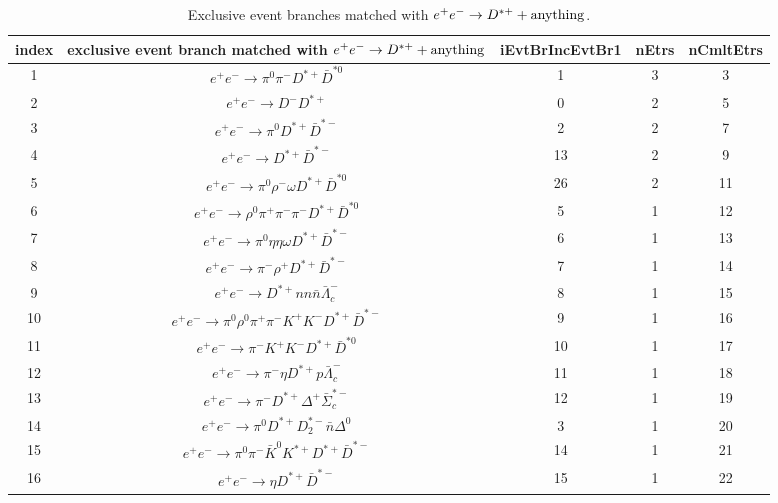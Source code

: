 \documentclass[landscape]{article}
\begin{document}
\begin{table}[htbp!]
\caption{Exclusive event branches matched with $ e^{+} e^{-} \rightarrow D^{*+} + \rm{anything} $.}
\small
\centering
\begin{tabular}{|c|c|c|c|c|}
\hline
index & exclusive event branch matched with $ e^{+} e^{-} \rightarrow D^{*+} + \rm{anything} $ & iEvtBrIncEvtBr1 & nEtrs & nCmltEtrs \\
\hline
1 & $ e^{+} e^{-} \rightarrow \pi^{0} \pi^{-} D^{*+} \bar{D}^{*0} $ & 1 & 3 & 3 \\
\hline
2 & $ e^{+} e^{-} \rightarrow D^{-} D^{*+} $ & 0 & 2 & 5 \\
\hline
3 & $ e^{+} e^{-} \rightarrow \pi^{0} D^{*+} \bar{D}^{*-} $ & 2 & 2 & 7 \\
\hline
4 & $ e^{+} e^{-} \rightarrow D^{*+} \bar{D}^{*-} $ & 13 & 2 & 9 \\
\hline
5 & $ e^{+} e^{-} \rightarrow \pi^{0} \rho^{-} \omega D^{*+} \bar{D}^{*0} $ & 26 & 2 & 11 \\
\hline
6 & $ e^{+} e^{-} \rightarrow \rho^{0} \pi^{+} \pi^{-} \pi^{-} D^{*+} \bar{D}^{*0} $ & 5 & 1 & 12 \\
\hline
7 & $ e^{+} e^{-} \rightarrow \pi^{0} \eta \eta \omega D^{*+} \bar{D}^{*-} $ & 6 & 1 & 13 \\
\hline
8 & $ e^{+} e^{-} \rightarrow \pi^{-} \rho^{+} D^{*+} \bar{D}^{*-} $ & 7 & 1 & 14 \\
\hline
9 & $ e^{+} e^{-} \rightarrow D^{*+} n n \bar{n} \bar{\Lambda}_{c}^{-} $ & 8 & 1 & 15 \\
\hline
10 & $ e^{+} e^{-} \rightarrow \pi^{0} \rho^{0} \pi^{+} \pi^{-} K^{+} K^{-} D^{*+} \bar{D}^{*-} $ & 9 & 1 & 16 \\
\hline
11 & $ e^{+} e^{-} \rightarrow \pi^{-} K^{+} K^{-} D^{*+} \bar{D}^{*0} $ & 10 & 1 & 17 \\
\hline
12 & $ e^{+} e^{-} \rightarrow \pi^{-} \eta D^{*+} p \bar{\Lambda}_{c}^{-} $ & 11 & 1 & 18 \\
\hline
13 & $ e^{+} e^{-} \rightarrow \pi^{-} D^{*+} \Delta^{+} \bar{\Sigma}_{c}^{*-} $ & 12 & 1 & 19 \\
\hline
14 & $ e^{+} e^{-} \rightarrow \pi^{0} D^{*+} D_{2}^{*-} \bar{n} \Delta^{0} $ & 3 & 1 & 20 \\
\hline
15 & $ e^{+} e^{-} \rightarrow \pi^{0} \pi^{-} \bar{K}^{0} K^{*+} D^{*+} \bar{D}^{*-} $ & 14 & 1 & 21 \\
\hline
16 & $ e^{+} e^{-} \rightarrow \eta D^{*+} \bar{D}^{*-} $ & 15 & 1 & 22 \\

\end{tabular}
\end{table}
\end{document}
